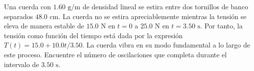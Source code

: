 \item Una cuerda con $1.60\text{ g/m}$ de densidad lineal se estira entre dos tornillos de banco separados $48.0\text{ cm}$. La cuerda no se estira apreciablemente mientras la tensión se eleva de manera estable de $15.0\text{ N}$ en $t = 0$ a $25.0\text{ N}$ en $t = 3.50\text{ s}$. Por tanto, la tensión como función del tiempo está dada por la expresión $T(t) = 15.0 + 10.0 t/3.50$. La cuerda vibra en su modo fundamental a lo largo de este proceso. Encuentre el número de oscilaciones que completa durante el intervalo de $3.50\text{ s}$.